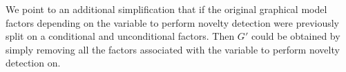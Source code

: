 \documentclass[a4paper]{article}
\begin{document}
We point to an additional simplification that if the original graphical model factors
depending on the variable to perform novelty detection were previously split on a
conditional and unconditional factors. Then $G'$ could be obtained by simply removing
all the factors associated with the variable to perform novelty detection on.


\cleardoublepage
{}
{}



\end{document}
